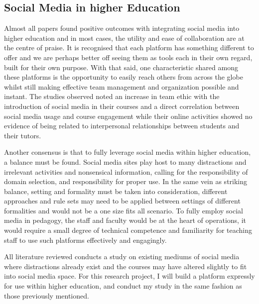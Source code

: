 \documentclass[lettersize,journal]{IEEEtran}
\begin{document}
        \subsection{Social Media in higher Education}
        Almost all papers found positive outcomes with integrating social media into higher education and in most cases, the utility and ease
        of collaboration are at the centre of praise. It is recognised that each platform has something different to offer and we are perhaps
        better off seeing them as tools each in their own regard, built for their own purpose. With that said, one characteristic shared among these platforms
         is the opportunity to easily reach others from across the globe whilst still making effective team management and organization possible and instant.
         The studies observed noted an increase in team ethic with the introduction of social media in their courses and a direct correlation between
         social media usage and course engagement while their online activities showed no evidence of being related to interpersonal relationships
         between students and their tutors.

	 Another consensus is that to fully leverage social media within higher education, a balance must be found.
         Social media sites play host to many distractions and irrelevant activities and nonsensical information, calling for the responsibility of domain
         selection, and responsibility for proper use. In the same vein as striking balance, setting and formality must be taken into consideration, different
         approaches and rule sets may need to be applied between settings of different formalities and would not be a one size fits all scenario. To fully
         employ social media in pedagogy, the staff and faculty would be at the heart of operations, it would require a small degree of technical competence and
         familiarity for teaching staff to use such platforms effectively and engagingly.

         All literature reviewed conducts a study on existing mediums of social media where distractions already exist and the courses may have altered slightly  to
         fit into social media space. For this research project, I will build a platform expressly for use within higher education,
         and conduct my study in the same fashion as those previously mentioned.
\end{document}
